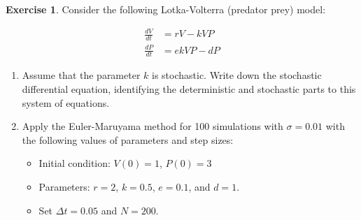 \documentclass[
]{book}
\theoremstyle{definition}
\theoremstyle{definition}
\theoremstyle{definition}
\newtheorem{exercise}{Exercise}[chapter]
\theoremstyle{remark}
\begin{document}
\begin{exercise}
\protect\hypertarget{exr:unnamed-chunk-345}{}{\label{exr:unnamed-chunk-345} }Consider the following Lotka-Volterra (predator prey) model:

\begin{equation}
\begin{split}
\frac{dV}{dt} &= r V - kVP \\
\frac{dP}{dt} &= e k V P - dP 
\end{split}
\end{equation}

\begin{enumerate}[label=\alph*.]
\item Assume that the parameter $k$ is stochastic.  Write down the stochastic differential equation, identifying the deterministic and stochastic parts to this system of equations.  
\item Apply the Euler-Maruyama method for 100 simulations with $\sigma=0.01$ with the following values of parameters and step sizes:

  \begin{itemize}
  \item Initial condition: $V(0)=1$, $P(0)=3$
  \item Parameters: $r = 2$, $k = 0.5$, $e = 0.1$, and $d = 1$.
  \item Set $\Delta t = 0.05$ and $N=200$.
  \end{itemize}
\end{enumerate}
\end{exercise}

~
\end{document}
